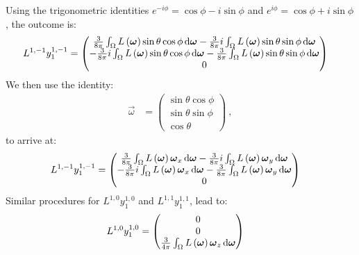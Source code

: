 Using the trigonometric identities $e^{-i\phi} = \operatorname{cos}\phi - i\operatorname{sin}\phi$ and $e^{i\phi} = \operatorname{cos}\phi + i\operatorname{sin}\phi$, the outcome is:
\begin{align}
L^{1,-1}y^{1,-1}_1 &= 
\begin{pmatrix}
\frac{3}{8\pi}\int_\Omega{L\left(\boldsymbol{\mathbf{\omega}}\right)\operatorname{sin}\theta\operatorname{cos}\phi\,\mathrm{d}\boldsymbol{\mathbf{\omega}}} - \frac{3}{8\pi}i\int_\Omega{L\left(\boldsymbol{\mathbf{\omega}}\right)\operatorname{sin}\theta\operatorname{sin}\phi\,\mathrm{d}\boldsymbol{\mathbf{\omega}}}
\\
-\frac{3}{8\pi}i\int_\Omega{L\left(\boldsymbol{\mathbf{\omega}}\right)\operatorname{sin}\theta\operatorname{cos}\phi\,\mathrm{d}\boldsymbol{\mathbf{\omega}}} - \frac{3}{8\pi}\int_\Omega{L\left(\boldsymbol{\mathbf{\omega}}\right)\operatorname{sin}\theta\operatorname{sin}\phi\,\mathrm{d}\boldsymbol{\mathbf{\omega}}}
\\
0
\end{pmatrix}
\end{align}
We then use the identity:
\begin{align}
\vec{\omega} &= 
\begin{pmatrix}
\operatorname{sin}\theta\operatorname{cos}\phi
\\
\operatorname{sin}\theta\operatorname{sin}\phi
\\
\operatorname{cos}\theta
\end{pmatrix}\ ,
\end{align}
to arrive at:
\begin{align}
L^{1,-1}y^{1,-1}_1 &= 
\begin{pmatrix}
\frac{3}{8\pi}\int_\Omega{L\left(\boldsymbol{\mathbf{\omega}}\right)\boldsymbol{\mathbf{\omega}}_x\,\mathrm{d}\boldsymbol{\mathbf{\omega}}} - \frac{3}{8\pi}i\int_\Omega{L\left(\boldsymbol{\mathbf{\omega}}\right)\boldsymbol{\mathbf{\omega}}_y\,\mathrm{d}\boldsymbol{\mathbf{\omega}}}
\\
-\frac{3}{8\pi}i\int_\Omega{L\left(\boldsymbol{\mathbf{\omega}}\right)\boldsymbol{\mathbf{\omega}}_x\,\mathrm{d}\boldsymbol{\mathbf{\omega}}} - \frac{3}{8\pi}\int_\Omega{L\left(\boldsymbol{\mathbf{\omega}}\right)\boldsymbol{\mathbf{\omega}}_y\,\mathrm{d}\boldsymbol{\mathbf{\omega}}}
\\
0
\end{pmatrix}
\end{align}
Similar procedures for $L^{1,0}y^{1,0}_1$ and $L^{1,1}y^{1,1}_1$, lead to:
\begin{align}
L^{1,0}y^{1,0}_1 &= 
\begin{pmatrix}
0\\
0\\
\frac{3}{4\pi}\int_\Omega{L\left(\boldsymbol{\mathbf{\omega}}\right)\boldsymbol{\mathbf{\omega}}_z\,\mathrm{d}\boldsymbol{\mathbf{\omega}}}
\end{pmatrix}
\end{align}

